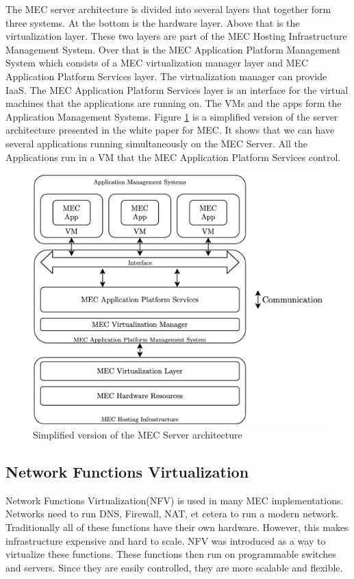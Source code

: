 The MEC server architecture is divided into several layers that together form three systems\cite{patel_mec_nodate}. At the bottom is the hardware layer. Above that is the virtualization layer. These two layers are part of the MEC Hosting Infrastructure Management System. Over that is the MEC Application Platform Management System which consists of a MEC virtualization manager layer and MEC Application Platform Services layer. The virtualization manager can provide IaaS. The MEC Application Platform Services layer is an interface for the virtual machines that the applications are running on. The VMs and the apps form the Application Management Systems. Figure \ref{fig:MEC_Server} is a simplified version of the server architecture presented in the white paper for MEC\cite{patel_mec_nodate}. It shows that we can have several applications running simultaneously on the MEC Server. All the Applications run in a VM that the MEC Application Platform Services control.
\begin{figure}[t]
    \centering
    \includegraphics[scale=0.3]{chapters/4_architectures/figures/MEC_server_screenshot.png}
    \caption{Simplified version of the MEC Server architecture}
    \label{fig:MEC_Server}
\end{figure}

\subsection{Network Functions Virtualization}
Network Functions Virtualization(NFV) is used in many MEC implementations\cite{patel_mec_nodate}. Networks need to run DNS, Firewall, NAT, et cetera to run a modern network. Traditionally all of these functions have their own hardware. However, this makes infrastructure expensive and hard to scale. NFV was introduced as a way to virtualize these functions. These functions then run on programmable switches and servers. Since they are easily controlled, they are more scalable and flexible.


